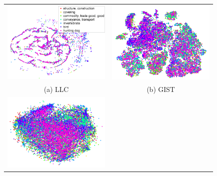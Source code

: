 \newcommand{\fsize}{.45\linewidth}
\begin{figure}
  \begin{tabular}{cc}
    \includegraphics[width=\fsize]{figs/decaf/LLC_quarter-fs8.png} & 
    \includegraphics[width=\fsize]{figs/decaf/gist_quarter-fs8.png}\\
    (a) LLC & (b) GIST \\
    \includegraphics[width=\fsize]{figs/decaf/pool1_quarter-fs8.png} & 

\end{tabular}
\end{figure}

